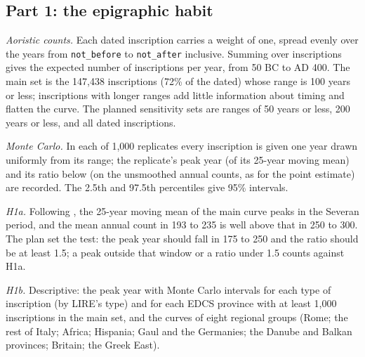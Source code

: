\documentclass[11pt,a4paper]{article}
\begin{document}
\subsection{Part 1: the epigraphic habit}
\textit{Aoristic counts.} Each dated inscription carries a weight of one, spread evenly over the years from \texttt{not\_before} to \texttt{not\_after} inclusive. Summing over inscriptions gives the expected number of inscriptions per year, from 50 BC to AD 400. The main set is the 147,438 inscriptions (72\% of the dated) whose range is 100 years or less; inscriptions with longer ranges add little information about timing and flatten the curve. The planned sensitivity sets are ranges of 50 years or less, 200 years or less, and all dated inscriptions.

\textit{Monte Carlo.} In each of 1,000 replicates every inscription is given one year drawn uniformly from its range; the replicate's peak year (of its 25-year moving mean) and its ratio below (on the unsmoothed annual counts, as for the point estimate) are recorded. The 2.5th and 97.5th percentiles give 95\% intervals.

\textit{H1a.} Following \citet{macmullen1982}, the 25-year moving mean of the main curve peaks in the Severan period, and the mean annual count in 193 to 235 is well above that in 250 to 300. The plan set the test: the peak year should fall in 175 to 250 and the ratio should be at least 1.5; a peak outside that window or a ratio under 1.5 counts against H1a.

\textit{H1b.} Descriptive: the peak year with Monte Carlo intervals for each type of inscription (by LIRE's type) and for each EDCS province with at least 1,000 inscriptions in the main set, and the curves of eight regional groups (Rome; the rest of Italy; Africa; Hispania; Gaul and the Germanies; the Danube and Balkan provinces; Britain; the Greek East).
\end{document}
